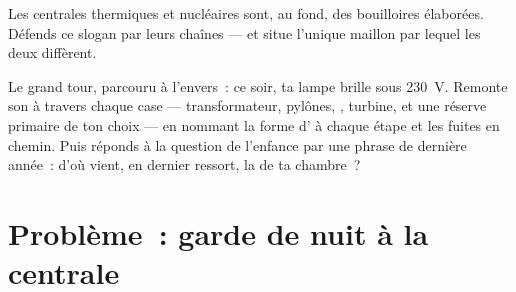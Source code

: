 \begin{exercise}[$\star\star$]\label{exo:g9:alternator:11}
Les centrales thermiques et nucléaires sont, au fond, des bouilloires
élaborées. Défends ce slogan par leurs chaînes --- et situe l'unique
maillon par lequel les deux diffèrent.
\end{exercise}

\begin{exercise}[$\star\star\star$]\label{exo:g9:alternator:12}
Le grand tour, parcouru à l'envers~: ce soir, ta lampe brille sous
\qty{230}{V}. Remonte son  à travers chaque case ---
transformateur, pylônes, , turbine, et une réserve primaire
de ton choix --- en nommant la forme d' à chaque étape et les
fuites en chemin. Puis réponds à la question de l'enfance par une
phrase de dernière année~: d'où vient, en dernier ressort, la 
de ta chambre~?
\end{exercise}

\section{Problème~: garde de nuit à la centrale}

